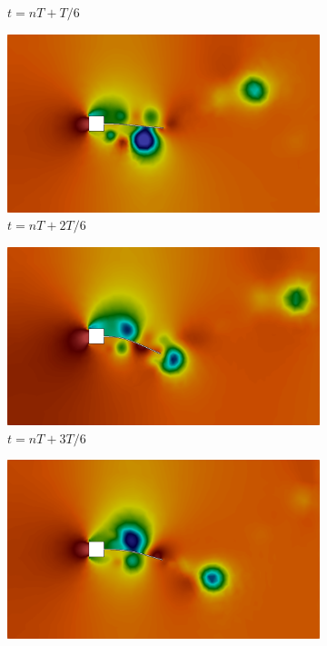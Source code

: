\begin{figure}[h!]
\begin{subfigure}[b]{0.32\textwidth}
        \caption{$t=nT+T/6$}
    \end{subfigure}
    \begin{subfigure}[b]{0.32\textwidth}
        \includegraphics[width=\linewidth]{Figuras/FSI-prism2/pT3.png}
        \caption{$t=nT+2T/6$}
    \end{subfigure}
    \begin{subfigure}[b]{0.32\textwidth}
        \includegraphics[width=\linewidth]{Figuras/FSI-prism2/pT4.png}
        \caption{$t=nT+3T/6$}
    \end{subfigure}
    \begin{subfigure}[b]{0.32\textwidth}
        \includegraphics[width=\linewidth]{Figuras/FSI-prism2/pT5.png}

\end{subfigure}
\end{figure}
